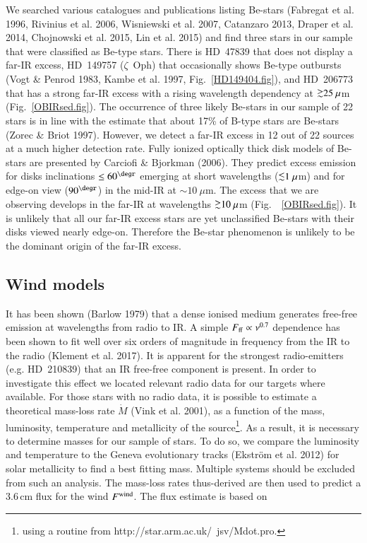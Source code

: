 \documentclass[tradiabstract]{aa} %
\newcommand{\simgreat} {\mathbin{\lower 3pt\hbox{$\rlap{\raise
        5pt\hbox{$\char'076$}}\mathchar"7218$}}}
\newcommand{\simless}{\mathbin{\lower 3pt\hbox {$\rlap{\raise
        5pt\hbox{$\char'074$}}\mathchar"7218$}}}
\begin{document}
We searched various catalogues and publications listing Be-stars
(Fabregat et al. 1996, Rivinius et al. 2006, Wisniewski et al. 2007,
Catanzaro 2013, Draper et al. 2014, Chojnowski et al. 2015, Lin et
al. 2015) and find three stars in our sample that were classified as
Be-type stars. There is HD~47839 that does not display a far-IR
excess, HD~149757 ($\zeta$~Oph) that occasionally shows Be-type
outbursts (Vogt \& Penrod 1983,  Kambe et al. 1997,
  Fig.~\ref{HD149404.fig}), and HD~206773 that has a strong far-IR
excess with a rising wavelength dependency at $\simgreat 25 \ \mu$m
(Fig.~\ref{OBIRsed.fig}).  The occurrence of three likely Be-stars in
our sample of 22 stars is in line with the estimate that about 17\% of
B-type stars are Be-stars (Zorec \& Briot 1997).  However, we detect a
far-IR excess in 12 out of 22 sources at a much higher detection
rate. Fully ionized optically thick disk models of Be-stars are
presented by Carciofi \& Bjorkman (2006).  They predict excess
emission for disks inclinations $\le 60^{\degr}$ emerging at short
wavelengths ($\simless 1 \ \mu$m) and for edge-on view ($90^{\degr}$)
in the mid-IR at $\sim 10 \ \mu$m. The excess that we are observing
develops in the far-IR at wavelengths $\simgreat 10 \ \mu$m
(Fig.~~\ref{OBIRsed.fig}). It is unlikely that all our far-IR excess
stars are yet unclassified Be-stars with their disks viewed nearly
edge-on. Therefore the Be-star phenomenon is unlikely to be the
dominant origin of the far-IR excess.


\subsection{Wind models}

It has been shown (Barlow 1979) that a dense ionised medium generates
free-free emission at wavelengths from radio to IR. A simple
$F_{\rm{ff}} \propto \nu^{0.7}$ dependence has been shown to fit well
over{ six orders of magnitude in frequency} from the IR to the
radio (Klement et al. 2017). { It} is apparent for the strongest
radio-emitters (e.g. HD~210839) that an IR free-free component is
present. In order to investigate this effect we located relevant radio
data for our targets where available. For those stars with no radio
data, it is possible to estimate a theoretical mass-loss rate
$\dot{M}$ (Vink et al. 2001), as a function of the mass, luminosity,
temperature and metallicity of the source\footnote{using a routine
  from http://star.arm.ac.uk/~jsv/Mdot.pro.}. As a result, it is
necessary to determine masses for our sample of stars. To do so, we
compare the luminosity and temperature to the Geneva evolutionary
tracks (Ekstr\"om et al. 2012) for solar metallicity to find a best
fitting mass. Multiple systems should be excluded from such an
analysis. The mass-loss rates thus-derived are then used to predict a
3.6\,cm flux for the wind $F^{\rm{wind}}$. The flux estimate is based
on
\end{document}
